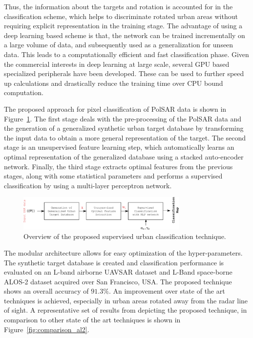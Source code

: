 \documentclass[12pt, a4paper]{article}
\begin{document}
Thus, the information about the targets and rotation is accounted for in the classification scheme, which helps to discriminate rotated urban areas without requiring explicit representation in the training stage. The advantage of using a deep learning based scheme is that, the network can be trained incrementally on a large volume of data, and subsequently used as a generalization for unseen data. This leads to a computationally efficient and fast classification phase. Given the commercial interests in deep learning at large scale, several GPU based specialized peripherals have been developed. These can be used to further speed up calculations and drastically reduce the training time over CPU bound computation.

The proposed approach for pixel classification of PolSAR data is shown in Figure~\ref{fig:0}. The first stage deals with the pre-processing of the PolSAR data and the generation of a generalized synthetic urban target database by transforming the input data to obtain a more general representation of the target. The second stage is an unsupervised feature learning step, which automatically learns an optimal representation of the generalized database using a stacked auto-encoder network. Finally, the third stage extracts optimal features from the previous stages, along with some statistical parameters and performs a supervised classification by using a multi-layer perceptron network.

\begin{figure}
\centering
\includegraphics[width = 0.75\textwidth]{Figures/Method0}
\caption{Overview of the proposed supervised urban classification technique.}
\label{fig:0}
\end{figure}

The modular architecture allows for easy optimization of the hyper-parameters. The synthetic target database is created and classification performance is evaluated on an L-band airborne UAVSAR dataset and L-Band space-borne ALOS-2 dataset acquired over San Francisco, USA. The proposed technique shows an overall accuracy of $91.3\%$. An improvement over state of the art techniques is achieved, especially in urban areas rotated away from the radar line of sight. A representative set of results from depicting the proposed technique, in comparison to other state of the art techniques is shown in Figure~\ref{fig:comparison_al2}. 
\end{document}
